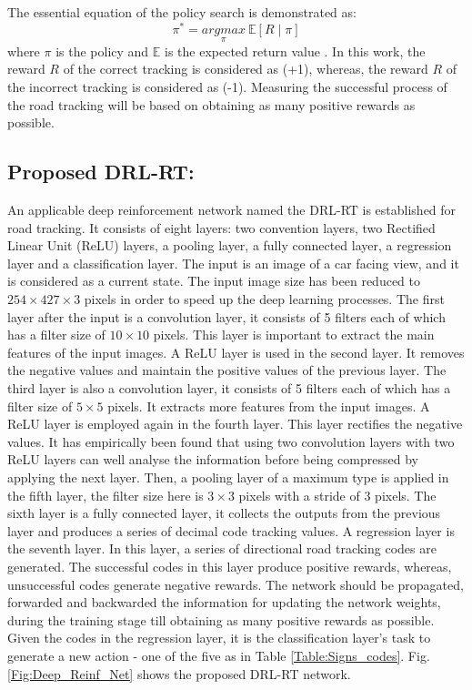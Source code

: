 \documentclass{svproc}
\begin{document}
The essential equation of the policy search is demonstrated as:
\begin{equation}
\pi^*=\underset{\pi}{argmax}~\mathbb{E} [R\mid\pi]
\label{Eq:MDP}
\end{equation}
where $\pi$ is the policy and $\mathbb{E}$ is the expected return value \cite{arulkumaran2017brief}. In this work, the reward $R$ of the correct tracking is considered as (+1), whereas, the reward $R$ of the incorrect tracking is considered as (-1). Measuring the successful process of the road tracking will be based on obtaining as many positive rewards as possible. 

\subsection{Proposed DRL-RT:} 
An applicable deep reinforcement network named the DRL-RT is established for road tracking. It consists of eight layers: two convention layers, two Rectified Linear Unit (ReLU) layers, a pooling layer, a fully connected layer, a regression layer and a classification layer. The input is an image of a car facing view, and it is considered as a current state. The input image size has been reduced to $254 \times 427 \times 3$ pixels in order to speed up the deep learning processes. The first layer after the input is a convolution layer, it consists of 5 filters each of which has a filter size of $10 \times 10$ pixels. This layer is important to extract the main features of the input images. A ReLU layer is used in the second layer. It removes the negative values and maintain the positive values of the previous layer. The third layer is also a convolution layer, it consists of 5 filters each of which has a filter size of $5 \times 5$ pixels. It extracts more features from the input images. A ReLU layer is employed again in the fourth layer. This layer rectifies the negative values. It has empirically been found that using two convolution layers with two ReLU layers can well analyse the information before being compressed by applying the next layer. Then, a pooling layer of a maximum type is applied in the fifth layer, the filter size here is $3 \times 3$ pixels with a stride of 3 pixels. The sixth layer is a fully connected layer, it collects the outputs from the previous layer and produces a series of decimal code tracking values. A regression layer is the seventh layer. In this layer, a series of directional road tracking codes are generated. The successful codes in this layer produce positive rewards, whereas, unsuccessful codes generate negative rewards. The network should be propagated, forwarded and backwarded the information for updating the network weights, during the training stage till obtaining as many positive rewards as possible. Given the codes in the regression layer, it is the classification layer's task to generate a new action - one of the five as in Table \ref{Table:Signs_codes}. Fig. \ref{Fig:Deep_Reinf_Net} shows the proposed DRL-RT network.
\end{document}
